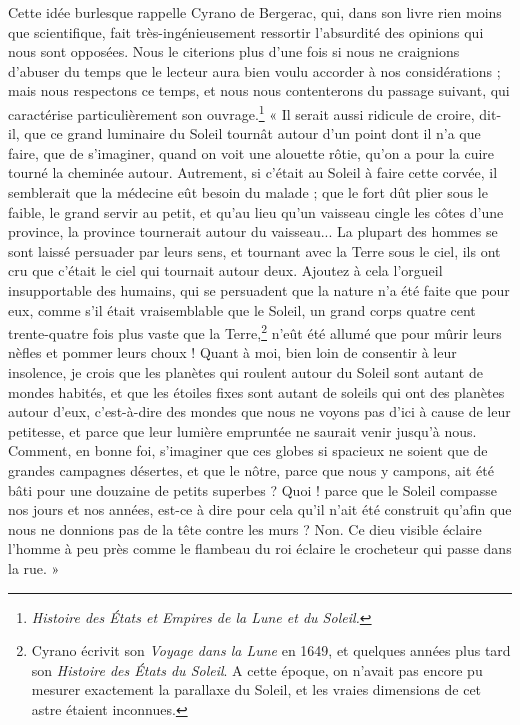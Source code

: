 \documentclass[a4paper, 11pt, oneside]{article}
\begin{document}
Cette idée burlesque rappelle Cyrano de Bergerac, qui, dans son livre rien moins que scientifique, fait très-ingénieusement ressortir l'absurdité des opinions qui nous sont opposées. Nous le citerions plus d'une fois si nous ne craignions d'abuser du temps que le lecteur aura bien voulu accorder à nos considérations ; mais nous respectons ce temps, et nous nous contenterons du passage suivant, qui caractérise particulièrement son ouvrage.\footnote{\emph{Histoire des États et Empires de la Lune et du Soleil.}} « Il serait aussi ridicule de croire, dit-il, que ce grand luminaire du Soleil tournât autour d'un point dont il n'a que faire, que de s'imaginer, quand on voit une alouette rôtie, qu'on a pour la cuire tourné la cheminée autour. Autrement, si c'était au Soleil à faire cette corvée, il semblerait que la médecine eût besoin du malade ; que le fort dût plier sous le faible, le grand servir au petit, et qu'au lieu qu'un vaisseau cingle les côtes d'une province, la province tournerait autour du vaisseau... La plupart des hommes se sont laissé persuader par leurs sens, et tournant avec la Terre sous le ciel, ils ont cru que c'était le ciel qui tournait autour deux. Ajoutez à cela l'orgueil insupportable des humains, qui se persuadent que la nature n'a été faite que pour eux, comme s'il était vraisemblable que le Soleil, un grand corps quatre cent trente-quatre fois plus vaste que la Terre,\footnote{Cyrano écrivit son \emph{Voyage dans la Lune} en 1649, et quelques années plus tard son \emph{Histoire des États du Soleil}. A cette époque, on n'avait pas encore pu mesurer exactement la parallaxe du Soleil, et les vraies dimensions de cet astre étaient inconnues.} n'eût été allumé que pour mûrir leurs nèfles et pommer leurs choux ! Quant à moi, bien loin de consentir à leur insolence, je crois que les planètes qui roulent autour du Soleil sont autant de mondes habités, et que les étoiles fixes sont autant de soleils qui ont des planètes autour d'eux, c'est-à-dire des mondes que nous ne voyons pas d'ici à cause de leur petitesse, et parce que leur lumière empruntée ne saurait venir jusqu'à nous. Comment, en bonne foi, s'imaginer que ces globes si spacieux ne soient que de grandes campagnes désertes, et que le nôtre, parce que nous y campons, ait été bâti pour une douzaine de petits superbes ? Quoi ! parce que le Soleil compasse nos jours et nos années, est-ce à dire pour cela qu'il n'ait été construit qu'afin que nous ne donnions pas de la tête contre les murs ? Non. Ce dieu visible éclaire l'homme à peu près comme le flambeau du roi éclaire le crocheteur qui passe dans la rue. »
\end{document}
